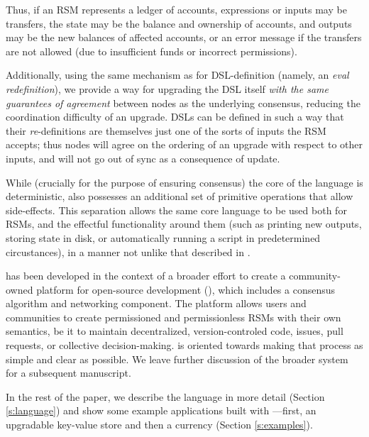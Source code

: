 Thus, if an RSM represents a ledger of accounts, expressions or inputs may be transfers, the
state may be the balance and ownership of accounts, and outputs may be the new
balances of affected accounts, or an error message if the transfers are not
allowed (due to insufficient funds or incorrect permissions).

Additionally, using the same mechanism as for DSL-definition (namely, an
\emph{eval redefinition}), we provide a way for upgrading the DSL itself
\emph{with the same guarantees of agreement} between nodes as the underlying
consensus, reducing the coordination difficulty of an upgrade. DSLs can be
defined in such a way that their \emph{re}-definitions are themselves just one of the
sorts of inputs the RSM accepts; thus nodes will agree on the ordering of an
upgrade with respect to other inputs, and will not go out of sync as a
consequence of update.

While (crucially for the purpose of ensuring consensus) the core of the language
is deterministic, \rad{} also possesses an additional set of primitive operations
that allow side-effects. This separation allows the same core language to be used
both for RSMs, and the effectful functionality around them (such as printing
new outputs, storing state in disk, or automatically running a script in
predetermined circustances), in a manner not unlike that described in
\cite{Cartwright1994}.

\rad{} has been developed in the context of a broader effort to create a
community-owned platform for open-source development (\oscoin{}), which
includes a consensus algorithm and networking component. The \oscoin{}
platform allows users and communities to create permissioned and permissionless
RSMs with their own semantics, be it to maintain decentralized,
version-controled code, issues, pull requests, or collective decision-making.
\rad{} is
oriented towards making that process as simple and clear as possible. We leave further
discussion of the broader \oscoin{} system for a subsequent manuscript.

In the rest of the paper, we describe the language in more detail (Section
\ref{s:language}) and show some example applications built with \rad{}---first,
an upgradable key-value store and then a currency
(Section \ref{s:examples}).
